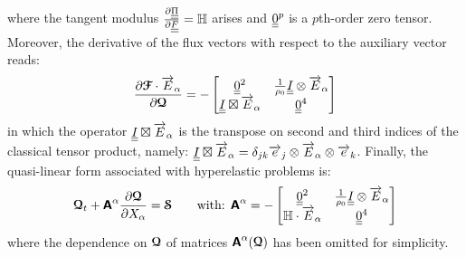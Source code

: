 where the tangent modulus $\drond{\tens{\Pi}}{\tens{F}}=\Hbb$ arises and $\tens{0}^p$ is a $p$th-order zero tensor. Moreover, the derivative of the flux vectors with respect to the auxiliary vector reads:
\begin{equation}
  \drond{\Fcb\cdot\vect{E}_\alpha}{\Qcb}=-\matrice{\tens{0}^2 & \frac{1}{\rho_0}\tens{I}\otimes\vect{E}_\alpha \\    \tens{I}\boxtimes \vect{E}_\alpha & \tens{0}^4}
\end{equation}
in which the operator $\tens{I}\boxtimes\vect{E}_\alpha$ is the transpose on second and third indices of the classical tensor product, namely: $\tens{I}\boxtimes\vect{E}_\alpha=\delta_{jk} \vect{e}_j\otimes \vect{E}_\alpha\otimes\vect{e}_k$.
Finally, the quasi-linear form associated with hyperelastic problems is:
\begin{equation}
  \Qcb_t + \Absf^\alpha \drond{\Qcb}{X_\alpha} = \Scb \qquad \text{with: }\Absf^\alpha = -\matrice{ \tens{0}^2 & \frac{1}{\rho_0}\tens{I}\otimes\vect{E}_\alpha \\ \Hbb\cdot\vect{E}_\alpha & \tens{0}^4} \label{eq:HE_quasilinear}
\end{equation}
where the dependence on $\Qcb$ of matrices $\Absf^\alpha(\Qcb)$ has been omitted for simplicity.

